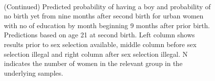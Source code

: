 \documentclass[12pt,letterpaper]{article}
\begin{document}
\begin{figure}[htpb]
{\begin{minipage}{0.31\textwidth}
        \captionsetup[subfigure]{labelformat=empty,position=top,captionskip=-1pt,farskip=-0.5pt}
        \\
        \captionsetup[subfigure]{labelformat=parens}
    \end{minipage}
}
\setcounter{subfigure}{6}
\caption{(Continued) Predicted probability of having a boy and probability of
no birth yet from nine months after second birth for urban 
women with no of education by month beginning 9 months after prior birth. 
Predictions based on age 21 at second birth.
Left column shows results prior to sex selection available, middle column before
sex selection illegal and right column after sex selection illegal.
N indicates the number of women in the relevant group in the underlying samples.
}
\end{figure}
\end{document}
